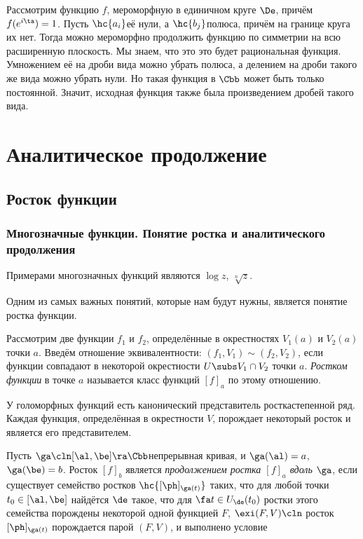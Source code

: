 \documentclass[a4paper]{article}
\begin{document}
Рассмотрим функцию $f$, мероморфную в единичном круге $\De$, причём $f(e^{i\ta})=1$. Пусть $\hc{a_i}$\т её нули,
а $\hc{b_j}$\т полюса, причём на границе круга их нет.
Тогда можно мероморфно продолжить функцию по симметрии на всю расширенную плоскость. Мы знаем, что это это будет
рациональная функция. Умножением её на дроби вида
можно убрать полюса, а делением на дроби такого же вида можно убрать нули. Но такая функция в $\Cbb$ может быть только
постоянной. Значит, исходная функция также была произведением дробей такого вида.

\section{Аналитическое продолжение}

\subsection{Росток функции}

\subsubsection{Многозначные функции. Понятие ростка и аналитического продолжения}

Примерами многозначных функций являются $\log z$, $\sqrt[n]{z}$.

Одним из самых важных понятий, которые нам будут нужны, является понятие ростка функции.

\begin{df}
Рассмотрим две функции $f_1$ и $f_2$, определённые в окрестностях $V_1(a)$ и $V_2(a)$ точки $a$. Введём отношение
эквивалентности: $(f_1, V_1) \sim (f_2, V_2)$, если функции совпадают в некоторой окрестности $U \subs V_1 \cap V_2$
точки $a$. \emph{Ростком функции} в точке $a$ называется класс функций $[f]_a$ по этому отношению.
\end{df}

У голоморфных функций есть канонический представитель ростка\т степенной ряд.
Каждая функция, определённая в окрестности $V$, порождает некоторый росток и является его представителем.

\begin{df}
Пусть $\ga\cln[\al,\be]\ra\Cbb$\т непрерывная кривая, и $\ga(\al)=a$, $\ga(\be)=b$.
Росток $[f]_b$ является \emph{продолжением ростка $[f]_a$ вдоль $\ga$}, если существует семейство ростков
$\hc{[\ph]_{\ga(t)}}$ таких, что для любой точки $t_0\in[\al,\be]$ найдётся $\de$ такое, что для $\fa t \in U_\de(t_0)$
ростки этого семейства порождены некоторой одной функцией $F$,  $\exi (F,V)\cln$ росток $[\ph]_{\ga(t)}$ порождается
парой $(F, V)$, и выполнено условие
\end{df}
\end{document}
